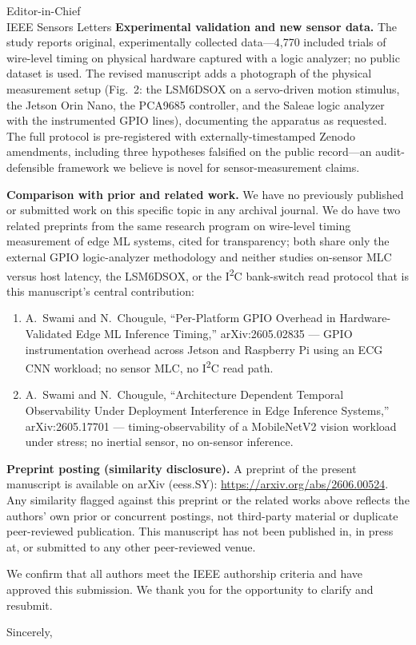\documentclass[11pt]{letter}
\begin{document}
\begin{letter}{Editor-in-Chief\\IEEE Sensors Letters}
\textbf{Experimental validation and new sensor data.} The study reports original, experimentally collected data---4,770 included trials of wire-level timing on physical hardware captured with a logic analyzer; no public dataset is used. The revised manuscript adds a photograph of the physical measurement setup (Fig.~2: the LSM6DSOX on a servo-driven motion stimulus, the Jetson Orin Nano, the PCA9685 controller, and the Saleae logic analyzer with the instrumented GPIO lines), documenting the apparatus as requested. The full protocol is pre-registered with externally-timestamped Zenodo amendments, including three hypotheses falsified on the public record---an audit-defensible framework we believe is novel for sensor-measurement claims.

\textbf{Comparison with prior and related work.} We have no previously published or submitted work on this specific topic in any archival journal. We do have two related preprints from the same research program on wire-level timing measurement of edge ML systems, cited for transparency; both share only the external GPIO logic-analyzer methodology and neither studies on-sensor MLC versus host latency, the LSM6DSOX, or the I\textsuperscript{2}C bank-switch read protocol that is this manuscript's central contribution:
\begin{enumerate}
\item A.~Swami and N.~Chougule, ``Per-Platform GPIO Overhead in Hardware-Validated Edge ML Inference Timing,'' arXiv:2605.02835 --- GPIO instrumentation overhead across Jetson and Raspberry Pi using an ECG CNN workload; no sensor MLC, no I\textsuperscript{2}C read path.
\item A.~Swami and N.~Chougule, ``Architecture Dependent Temporal Observability Under Deployment Interference in Edge Inference Systems,'' arXiv:2605.17701 --- timing-observability of a MobileNetV2 vision workload under stress; no inertial sensor, no on-sensor inference.
\end{enumerate}

\textbf{Preprint posting (similarity disclosure).} A preprint of the present manuscript is available on arXiv (eess.SY): \url{https://arxiv.org/abs/2606.00524}. Any similarity flagged against this preprint or the related works above reflects the authors' own prior or concurrent postings, not third-party material or duplicate peer-reviewed publication. This manuscript has not been published in, in press at, or submitted to any other peer-reviewed venue.

We confirm that all authors meet the IEEE authorship criteria and have approved this submission. We thank you for the opportunity to clarify and resubmit.

\closing{Sincerely,}
\end{letter}
\end{document}
